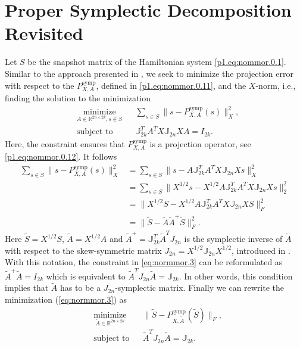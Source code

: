 \section{Proper Symplectic Decomposition Revisited} \label{sec:normmor.1.1}
Let $S$ be the snapshot matrix of the Hamiltonian system \eqref{p1.eq:nommor.0.1}. Similar to the approach presented in , we seek to minimize the projection error with respect to the $P_{X,A}^{\text{symp}}$, defined in \eqref{p1.eq:nommor.0.11}, and the $X$-norm, i.e., finding the solution to the minimization
\begin{equation} \label{eq:normmor.3}
\begin{aligned}
& \underset{A\in \mathbb{R}^{2n\times 2k}, s\in S}{\text{minimize}}
& & \sum_{s\in S} \| s - P_{X,A}^{\text{symp}}(s) \|_X^2, \\
& \text{subject to}
& & \mathbb J_{2k}^T A^T X \mathbb J_{2n} X A = I_{2k}.
\end{aligned}
\end{equation}
Here, the constraint ensures that $P_{X,A}^{\text{symp}}$ is a projection operator, see \eqref{p1.eq:nommor.0.12}. It follows
\begin{equation} \label{eq:normmor.4}
\begin{aligned}
	\sum_{s\in S} \| s - P_{X,A}^{\text{symp}}(s) \|_X^2 &= \sum_{s\in S} \| s - A \mathbb J_{2k}^T A^T X \mathbb J_{2n} Xs \|_X^2 \\
	&= \sum_{s\in S} \| X^{1/2}s - X^{1/2} A \mathbb J_{2k}^T A^T X \mathbb J_{2n} X s \|_2^2 \\
	&= \| X^{1/2} S - X^{1/2} A \mathbb J_{2k}^T A^T X \mathbb J_{2n} X S \|_F^2 \\
	&= \| \tilde S - \tilde A \tilde A ^+ \tilde S \|_F^2.
\end{aligned}
\end{equation}
Here $\tilde S = X^{1/2} S$, $\tilde A = X^{1/2} A$ and $\tilde A^+ = \mathbb J_{2k}^T \tilde A^T J_{2n}$ is the symplectic inverse of $\tilde A$ with respect to the skew-symmetric matrix $J_{2n} = X^{1/2} \mathbb J_{2n} X^{1/2}$, introduced in . With this notation, the constraint in \eqref{eq:normmor.3} can be reformulated as $\tilde A ^+ \tilde A = I_{2k}$ which is equivalent to $\tilde A ^T J_{2n} \tilde A = \mathbb J_{2k}$. In other words, this condition implies that $\tilde A$ has to be a $J_{2n}$-symplectic matrix. Finally we can rewrite the minimization (\ref{eq:normmor.3}) as
\begin{equation} \label{eq:normmor.5}
\begin{aligned}
& \underset{\tilde A\in \mathbb{R}^{2n\times 2k}}{\text{minimize}}
& & \| \tilde S - P^\text{symp}_{X,\tilde A}(\tilde S) \|_F, \\
& \text{subject to}
& & \tilde A^T J_{2n} \tilde A = \mathbb J_{2k}.
\end{aligned}
\end{equation}
